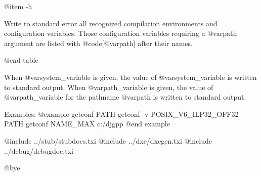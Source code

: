 @item -h

Write to standard error all recognized compilation environments and
configuration variables.  Those configuration variables requiring a
@var{path} argument are listed with @code{[@var{path}]} after their names.

@end table

When @var{system_variable} is given, the value of @var{system_variable}
is written to standard output.  When @var{path_variable} is given, the
value of @var{path_variable} for the pathname @var{path} is written to
standard output.

Examples:
@example
getconf PATH
getconf -v POSIX_V6_ILP32_OFF32 PATH
getconf NAME_MAX c:/djgpp
@end example

@include ../stub/stubdocs.txi
@include ../dxe/dxegen.txi
@include ../debug/debugdoc.txi

@bye
